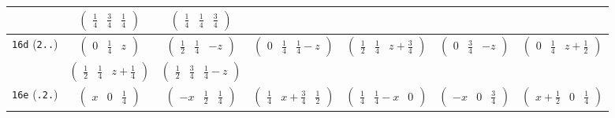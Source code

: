 \documentclass[fleqn,9pt,landscape]{jsarticle}
\begin{document}
\begin{center}
\begin{longtable}{ccccccc}
& $ \begin{pmatrix} \frac{1}{4} & \frac{3}{4} & \frac{1}{4} \end{pmatrix} $ & $ \begin{pmatrix} \frac{1}{4} & \frac{1}{4} & \frac{3}{4} \end{pmatrix} $ & $  $ & $  $ & $  $ & $  $ \\ \hline
{\tt 16d} ({\tt 2..}) & $ \begin{pmatrix} 0 & \frac{1}{4} & z \end{pmatrix} $ & $ \begin{pmatrix} \frac{1}{2} & \frac{1}{4} & - z \end{pmatrix} $ & $ \begin{pmatrix} 0 & \frac{1}{4} & \frac{1}{4} - z \end{pmatrix} $ & $ \begin{pmatrix} \frac{1}{2} & \frac{1}{4} & z + \frac{3}{4} \end{pmatrix} $ & $ \begin{pmatrix} 0 & \frac{3}{4} & - z \end{pmatrix} $ & $ \begin{pmatrix} 0 & \frac{1}{4} & z + \frac{1}{2} \end{pmatrix} $ \\
& $ \begin{pmatrix} \frac{1}{2} & \frac{1}{4} & z + \frac{1}{4} \end{pmatrix} $ & $ \begin{pmatrix} \frac{1}{2} & \frac{3}{4} & \frac{1}{4} - z \end{pmatrix} $ & $  $ & $  $ & $  $ & $  $ \\ \hline
{\tt 16e} ({\tt .2.}) & $ \begin{pmatrix} x & 0 & \frac{1}{4} \end{pmatrix} $ & $ \begin{pmatrix} - x & \frac{1}{2} & \frac{1}{4} \end{pmatrix} $ & $ \begin{pmatrix} \frac{1}{4} & x + \frac{3}{4} & \frac{1}{2} \end{pmatrix} $ & $ \begin{pmatrix} \frac{1}{4} & \frac{1}{4} - x & 0 \end{pmatrix} $ & $ \begin{pmatrix} - x & 0 & \frac{3}{4} \end{pmatrix} $ & $ \begin{pmatrix} x + \frac{1}{2} & 0 & \frac{1}{4} \end{pmatrix} $ \\

\end{longtable}
\end{center}
\end{document}
